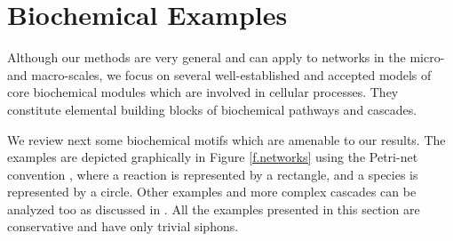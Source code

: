 \documentclass[onefignum,onetabnum]{siamonline220329}
\begin{document}
{\section{Biochemical Examples}

Although our methods are very general and can apply to networks in the micro- and macro-scales, we   focus on several well-established and accepted models of core biochemical modules which are involved in   cellular processes. They constitute     elemental building blocks of biochemical pathways and  cascades. %

 We review next some biochemical motifs which are amenable to our results. {The examples are depicted graphically in Figure \ref{f.networks} using the Petri-net convention \cite{petri08}, where a reaction is represented by a {rectangle}, and a species is repres{e}nted by a circle.} Other examples and more complex cascades can be analyzed too as discussed in \cite{MA_LEARN,MA_MCSS23}. All the examples presented in this section are conservative and have only trivial siphons.
\begin{figure}[t]
	\centering
\end{figure}}
\end{document}
